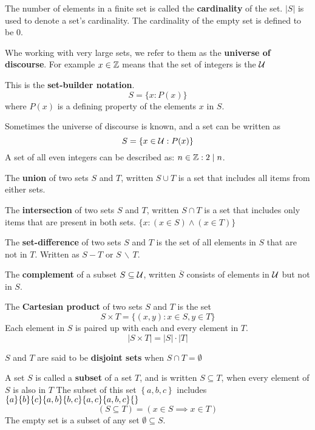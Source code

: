 \documentclass[english, 12pt]{article}
\begin{document}
\begin{defn}
The number of elements in a finite set is called the \textbf{cardinality} of the set. $ |S|$ is used to denote a set's cardinality. The cardinality of the empty set is defined to be 0.
\end{defn}
\begin{defn}
Whe working with very large sets, we refer to them as the \textbf{universe of discourse}. For example $x \in {\mathbb{Z}}$ means that the set of integers is the ${\mathcal{U}}$
\end{defn}
\begin{exmp}
This is the \textbf{set-builder notation}.
\[S = \{ x : P(x)\} \]
where $P(x)$ is a defining property of the elements $x$ in $S$.
\end{exmp}
\begin{exmp}
Sometimes the universe of discourse is known, and a set can be written as 
\[S = \{ x \in {\mathcal{U}}: P(x)\} \]
A set of all even integers can be described as: $ n \in {\mathbb{Z}} : 2 \mid n$.
\end{exmp}
\begin{defn}
The \textbf{union} of two sets $S$ and $T$, written $S \cup T$ is a set that includes all items from either sets.
\end{defn}
\begin{defn}
The \textbf{intersection} of two sets $S$ and $T$, written $S \cap T$ is a set that includes only items that are present in both sets. $\{x : (x \in S) \land (x \in T)\}$
\end{defn}
\begin{defn}
The \textbf{set-difference} of two sets $S$ and $T$ is the set of all elements in $S$ that are not in $T$. Written as $S - T$ or $S\,\backslash\, T$.
\end{defn}
\begin{defn}
The \textbf{complement} of a subset $S \subseteq {\mathcal{U}}$, written $\overline{S}$ consists of elements in ${\mathcal{U}}$ but not in $S$.
\end{defn}
\begin{defn}
The \textbf{Cartesian product} of two sets $S$ and $T$ is the set 
\[S \times T = \{(x,y) : x \in S, y \in T \} \]
Each element in $S$ is paired up with each and every element in $T$.
\[ |S \times T| = |S|\cdot |T| \]
\end{defn}
\begin{defn}
$S$ and $T$ are said to be \textbf{disjoint sets} when $S \cap T = \emptyset$
\end{defn}

\begin{defn}
A set $S$ is called a \textbf{subset} of a set $T$, and is written $S \subseteq T$, when every element of $S$ is also in $T$
The subset of this set $\left\{ {a,b,c}\right\}$ includes
$\foreach \n in {a,b,c,{a,b},{b,c},{a,c},{a,b,c},{}}{\lbrace \n \rbrace}$
\[(S \subseteq T) = (x \in S \implies x \in T)\]
The empty set is a subset of any set $\emptyset \subseteq S$.
\end{defn}
\end{document}

